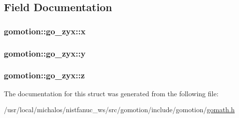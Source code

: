 \subsection{Field Documentation}
\hypertarget{structgomotion_1_1go__zyx_aa79612f67b18b68f67cb02bde877c083}{
\subsubsection[{x}]{ gomotion\-::go\-\_\-zyx\-::x}}\label{structgomotion_1_1go__zyx_aa79612f67b18b68f67cb02bde877c083}
\hypertarget{structgomotion_1_1go__zyx_a014cdc80c1901732b84cb1eb65258a82}{
\subsubsection[{y}]{ gomotion\-::go\-\_\-zyx\-::y}}\label{structgomotion_1_1go__zyx_a014cdc80c1901732b84cb1eb65258a82}
\hypertarget{structgomotion_1_1go__zyx_aa05f917941bc93c5f19298a1dd16d4f6}{
\subsubsection[{z}]{ gomotion\-::go\-\_\-zyx\-::z}}\label{structgomotion_1_1go__zyx_aa05f917941bc93c5f19298a1dd16d4f6}


The documentation for this struct was generated from the following file\-:\begin{DoxyCompactItemize}
\item 
/usr/local/michalos/nistfanuc\-\_\-ws/src/gomotion/include/gomotion/\hyperlink{gomath_8h}{gomath.\-h}\end{DoxyCompactItemize}
